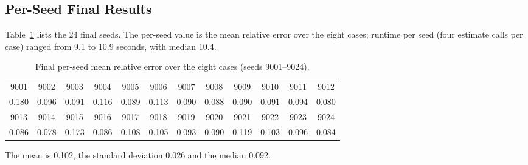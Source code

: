 \documentclass{article}
\begin{document}
\subsection{Per-Seed Final Results}
Table~\ref{tab:seeds} lists the 24 final seeds. The per-seed value is the mean relative error over the eight cases; runtime per seed (four estimate calls per case) ranged from 9.1 to 10.9 seconds, with median 10.4. %
\begin{table}[h]
\centering\small
\caption{Final per-seed mean relative error over the eight cases (seeds 9001--9024).}
\label{tab:seeds}
\begin{tabular}{cccccccccccc}
\toprule
9001&9002&9003&9004&9005&9006&9007&9008&9009&9010&9011&9012\\
0.180&0.096&0.091&0.116&0.089&0.113&0.090&0.088&0.090&0.091&0.094&0.080\\ %
\midrule
9013&9014&9015&9016&9017&9018&9019&9020&9021&9022&9023&9024\\
0.086&0.078&0.173&0.086&0.108&0.105&0.093&0.090&0.119&0.103&0.096&0.084\\ %
\bottomrule
\end{tabular}
\end{table}
The mean is 0.102, the standard deviation 0.026 and the median 0.092. %
\end{document}

